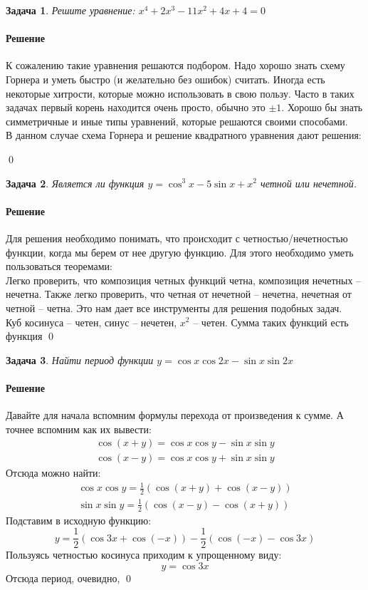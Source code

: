 \documentclass[a4paper,12pt]{report}
\newtheorem{problem}{Задача}[chapter]
\newenvironment{sol}{\paragraph{Решение}}{}
\begin{document}
	\begin{problem}
		Решите уравнение: $x^4+2x^3-11x^2+4x+4=0$
	\end{problem}
	\begin{sol}
		К сожалению такие уравнения решаются подбором. Надо хорошо знать схему Горнера и уметь быстро (и желательно без ошибок) считать. Иногда есть некоторые хитрости, которые можно использовать в свою пользу. Часто в таких задачах первый корень находится очень просто, обычно это $\pm1$. Хорошо бы знать симметричные и иные типы уравнений, которые решаются своими способами.\\
		
		В данном случае схема Горнера и решение квадратного уравнения дают решения:
		\begin{center}
		\end{center}
		\qed
	\end{sol}
	\begin{problem}
		Является ли функция $y=\cos^3x-5\sin x + x^2$ четной или нечетной.
	\end{problem}
	\begin{sol}
		Для решения необходимо понимать, что происходит с четностью/нечетностью функции, когда мы берем от нее другую функцию. Для этого необходимо уметь пользоваться теоремами:\\
		
		Легко проверить, что композиция четных функций четна, композиция нечетных -- нечетна. Также легко проверить, что четная от нечетной -- нечетна, нечетная от четной -- четна. Это нам дает все инструменты для решения подобных задач.\\
		
		Куб косинуса -- четен, синус -- нечетен, $x^2$ -- четен. Сумма таких функций есть функция 
		\qed
	\end{sol}
	
	\begin{problem}
		Найти период функции $y=\cos{x}\cos{2x}-\sin{x}\sin{2x}$
	\end{problem}
	\begin{sol}
		Давайте для начала вспомним формулы перехода от произведения к сумме. А точнее вспомним как их вывести:\\
		\begin{eqnarray*}
			\cos{(x+y)}=\cos{x}\cos{y}-\sin{x}\sin{y}\\
			\cos{(x-y)}=\cos{x}\cos{y}+\sin{x}\sin{y}
		\end{eqnarray*}
		Отсюда можно найти:
		\begin{eqnarray*}
			\cos{x}\cos{y}=\frac{1}{2}(\cos{(x+y)}+\cos{(x-y)})\\
			\sin{x}\sin{y}=\frac{1}{2}(\cos{(x-y)}-\cos{(x+y)})
		\end{eqnarray*}
		Подставим в исходную функцию:
		\[
		y=\frac{1}{2}(\cos{3x}+\cos{(-x)})-\frac{1}{2}(\cos{(-x)}-\cos{3x})
		\]
		Пользуясь четностью косинуса приходим к упрощенному виду:
		\[
		y=\cos{3x}
		\]
		Отсюда период, очевидно, 
		\qed
	\end{sol}
	
\end{document}
